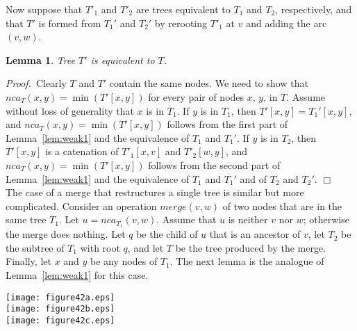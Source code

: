\documentclass[twoside,leqno,twocolumn]{article}
\newtheorem{lemma}{Lemma}
\newcommand{\proof}{\noindent \emph{Proof.}\ }
\newcommand{\proofend}{$\Box$\\}
\newcommand{\merge}{\mathit{merge}}
\newcommand{\nca}{\mathit{nca}}
\begin{document}
Now suppose that $T'_1$ and $T'_2$ are trees equivalent to $T_1$ and $T_2$, respectively, and that $T'$ is formed from $T_1'$ and
$T_2'$ by rerooting $T'_1$ at $v$ and adding the arc $(v,w)$.

\begin{lemma}\label{lem:weak2} Tree $T'$ is equivalent to $T$.
\end{lemma}
\proof Clearly $T$ and $T'$ contain the same nodes.  We need to show that $\nca_{T}(x, y) = \min(T'[x, y])$ for every pair of nodes $x$, $y$, in $T$.  Assume without loss of generality that $x$ is in $T_1$.  If $y$ is in $T_1$, then $T'[x,y] = T_1'[x,y]$, and $\nca_{T}(x, y) = \min(T'[x,y])$ follows from the first part of Lemma~\ref{lem:weak1} and the equivalence of $T_1$ and $T_1'$.  If $y$ is in $T_2$, then $T'[x,y]$ is a catenation of $T'_1[x,v]$ and $T'_2[w,y]$, and $\nca_{T}(x, y) = \min(T'[x, y])$ follows from the second part of Lemma~\ref{lem:weak1} and the equivalence of $T_1$ and $T_1'$ and of $T_2$ and $T_2'$. \proofend


The case of a merge that restructures a single tree is similar but more complicated.  Consider an operation $\merge(v, w)$ of two nodes that are in the same tree $T_1$.  Let $u = \nca_{T_1}(v, w)$.  Assume that $u$ is neither $v$ nor $w$; otherwise the merge does nothing.  Let $q$ be the child of $u$ that is an ancestor of $v$, let $T_2$ be the subtree of $T_1$ with root $q$, and let $T$ be the tree produced by the merge.  Finally, let $x$ and $y$ be any nodes of $T_1$.  The next lemma is the analogue of Lemma~\ref{lem:weak1} for this case.

\begin{figure*}\begin{center}
\resizebox{1.\textwidth}{!} {\texttt{[image: figure42a.eps]}}\\
\vspace{.5cm}
\resizebox{1.\textwidth}{!} {\texttt{[image: figure42b.eps]}}\\
\vspace{.5cm}
\resizebox{1.\textwidth}{!} {\texttt{[image: figure42c.eps]}}
\end{center}
\caption{\label{fig:weak-merge-2} Proof of Lemma~\ref{lem:weak3}. Node $q$ is the child of $u$ in $T_1$ that is an ancestor of $v$.
Nodes in the subtree of $q$ are black and the rest are white. Grey nodes can be either black or white depending on the node labels.
(a) Both $x$ and $y$ are in $T_2$. After the merge, $\min \{v,w\}$ is on $T[u,\max\{v,w\}]$. (b) Neither is in $T_2$. Here we assume $t<q$.  After the merge, $\min \{v,w\}$ is on $T[t,\max\{v,w\}]$. (c) Only $x$ is in $T_2$; the situation is similar if only $y$ is in $T_2$. Here we assume $t<q$.  After the merge, $\min \{v,w\}$ is on $T[t,\max\{v,w\}]$.}
\end{figure*}
\end{document}
